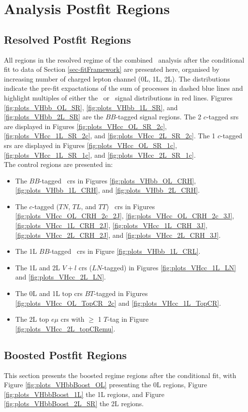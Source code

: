 \section{Analysis Postfit Regions}\label{appsec-vh-analRegPosfit}
\subsection{Resolved Postfit Regions}\label{appsec-vh-analRegResPosfit}
All regions in the resolved regime of the combined \vhbc\ analysis after the conditional fit to data of Section \ref{sec-fitFramework} are presented here, organised by increasing number of charged lepton channel (0L, 1L, 2L). The distributions indicate the pre-fit expactations of the sum of processes in dashed blue lines and highlight multiples of either the \vhb\ or \vhc\ signal distributions in red lines. Figures \ref{fig:plots_VHbb_OL_SR}, \ref{fig:plots_VHbb_1L_SR}, and \ref{fig:plots_VHbb_2L_SR} are the $BB$-tagged signal regions. The 2 $c$-tagged \glspl{sr} are displayed in Figures \ref{fig:plots_VHcc_OL_SR_2c}, \ref{fig:plots_VHcc_1L_SR_2c}, and \ref{fig:plots_VHcc_2L_SR_2c}.  The 1 $c$-tagged \glspl{sr} are displayed in Figures \ref{fig:plots_VHcc_OL_SR_1c}, \ref{fig:plots_VHcc_1L_SR_1c}, and \ref{fig:plots_VHcc_2L_SR_1c}. \\

The control regions are presented in:
\begin{itemize}
  \item The $BB$-tagged \highdr\ \glspl{cr} in Figures \ref{fig:plots_VHbb_OL_CRH}, \ref{fig:plots_VHbb_1L_CRH}, and \ref{fig:plots_VHbb_2L_CRH}.
  \item The $c$-tagged ($TN$, $TL$, and $TT$) \highdr\ \glspl{cr} in Figures \ref{fig:plots_VHcc_OL_CRH_2c_2J}, \ref{fig:plots_VHcc_OL_CRH_2c_3J}, \ref{fig:plots_VHcc_1L_CRH_2J}, \ref{fig:plots_VHcc_1L_CRH_3J}, \ref{fig:plots_VHcc_2L_CRH_2J}, and \ref{fig:plots_VHcc_2L_CRH_3J}.
  \item The 1L $BB$-tagged \lowdr\ \glspl{cr} in Figure \ref{fig:plots_VHbb_1L_CRL}.
  \item The 1L and 2L $V+l$ \glspl{cr} ($LN$-tagged) in Figures \ref{fig:plots_VHcc_1L_LN} and \ref{fig:plots_VHcc_2L_LN}.
  \item The 0L and 1L top \glspl{cr} $BT$-tagged in Figures \ref{fig:plots_VHcc_OL_TopCR_2c} and \ref{fig:plots_VHcc_1L_TopCR}.
  \item The 2L top $e\mu$ \glspl{cr} with $\geq$ 1 $T$-tag in Figure \ref{fig:plots_VHcc_2L_topCRemu}.
\end{itemize}
  
\subsection{Boosted Postfit Regions}\label{appsec-vh-analRegBooPosfit}
This section presents the boosted regime regions after the conditional fit, with Figure \ref{fig:plots_VHbbBoost_OL} presenting the 0L regions, Figure \ref{fig:plots_VHbbBoost_1L} the 1L regions, and Figure \ref{fig:plots_VHbbBoost_2L_SR} the 2L regions.

\clearpage

\clearpage 

\clearpage
